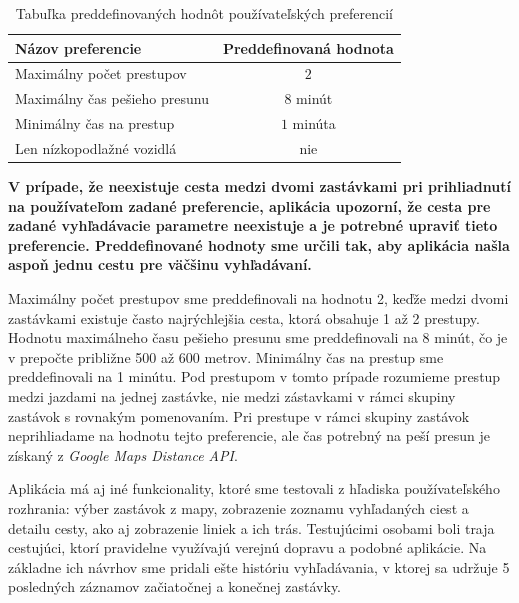 \begin{table}[H]
\small
\begin{center}
\begin{tabular}{|l|c|}
\hline
\rowcolor[HTML]{C0C0C0} 
\textbf{Názov preferencie} & \textbf{Preddefinovaná hodnota} \\ \hline
Maximálny počet prestupov  & $2$         \\ \hline
Maximálny čas pešieho presunu & $8$  minút  \\ \hline
Minimálny čas na prestup & $1$ minúta  \\ \hline
Len nízkopodlažné vozidlá & nie  \\ \hline
\end{tabular}
\end{center}
\caption{Tabuľka preddefinovaných hodnôt používateľských preferencií}
\label{table:default-preferencies}
\end{table}

\textbf{V prípade, že neexistuje cesta medzi dvomi zastávkami pri prihliadnutí na používateľom zadané preferencie, aplikácia upozorní, že cesta pre zadané vyhľadávacie parametre neexistuje a je potrebné upraviť tieto preferencie. Preddefinované hodnoty sme určili tak, aby aplikácia našla aspoň jednu cestu pre väčšinu vyhľadávaní.}

Maximálny počet prestupov sme preddefinovali na hodnotu 2, keďže medzi dvomi zastávkami existuje často najrýchlejšia cesta, ktorá obsahuje 1 až 2 prestupy. Hodnotu maximálneho času pešieho presunu sme preddefinovali na 8 minút, čo je v prepočte približne 500 až 600 metrov. Minimálny čas na prestup sme preddefinovali na 1 minútu. Pod prestupom v tomto prípade rozumieme prestup medzi jazdami na jednej zastávke, nie medzi zástavkami v rámci skupiny zastávok s rovnakým pomenovaním. Pri prestupe v rámci skupiny zastávok neprihliadame na hodnotu tejto preferencie, ale čas potrebný na peší presun je získaný z \textit{Google Maps Distance API}.

Aplikácia má aj iné funkcionality, ktoré sme testovali z hľadiska používateľského rozhrania: výber zastávok z mapy, zobrazenie zoznamu vyhľadaných ciest a detailu cesty, ako aj zobrazenie liniek a ich trás. Testujúcimi osobami boli traja cestujúci, ktorí pravidelne využívajú verejnú dopravu a podobné aplikácie. Na základne ich návrhov sme pridali ešte históriu vyhľadávania, v ktorej sa udržuje 5 posledných záznamov začiatočnej a konečnej zastávky. 


